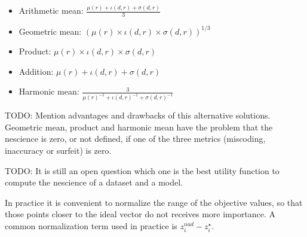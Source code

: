 \begin{itemize}
\item Arithmetic mean: $\frac{\mu(r) + \iota(d, r) + \sigma(d, r)}{3}$
\item Geometric mean: $\left( \mu(r) \times \iota(d, r) \times \sigma(d, r) \right)^{1/3}$
\item Product: $\mu(r) \times \iota(d, r) \times \sigma(d, r)$
\item Addition: $\mu(r) + \iota(d, r) + \sigma(d, r)$
\item Harmonic mean: $\frac{3}{ \mu(r)^{-1} + \iota(d, r)^{-1} + \sigma(d, r)^{-1} }$
\end{itemize}

{\color{red} TODO: Mention advantages and drawbacks of this alternative solutions.} Geometric mean, product and harmonic mean have the problem that the nescience is zero, or not defined, if one of the three metrics (miscoding, inaccuracy or surfeit) is zero.

{\color{red} TODO: It is still an open question which one is the best utility function to compute the nescience of a dataset and a model.}

{\color{red} In practice it is convenient to normalize the range of the objective values, so that those points closer to the ideal vector do not receives more importance. A common normalization term used in practice is $z_i^{nad} - z_i^\star$.}


